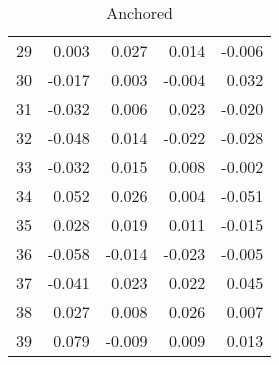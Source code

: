 \begin{table}[ht]
\begin{tabular}{rrrrr}
  29 & 0.003 & 0.027 & 0.014 & -0.006 \\ 
  30 & -0.017 & 0.003 & -0.004 & 0.032 \\ 
  31 & -0.032 & 0.006 & 0.023 & -0.020 \\ 
  32 & -0.048 & 0.014 & -0.022 & -0.028 \\ 
  33 & -0.032 & 0.015 & 0.008 & -0.002 \\ 
  34 & 0.052 & 0.026 & 0.004 & -0.051 \\ 
  35 & 0.028 & 0.019 & 0.011 & -0.015 \\ 
  36 & -0.058 & -0.014 & -0.023 & -0.005 \\ 
  37 & -0.041 & 0.023 & 0.022 & 0.045 \\ 
  38 & 0.027 & 0.008 & 0.026 & 0.007 \\ 
  39 & 0.079 & -0.009 & 0.009 & 0.013 \\ 
   \hline
\end{tabular}
\caption{Anchored} 
\label{table:anchored-xi}
\end{table}
